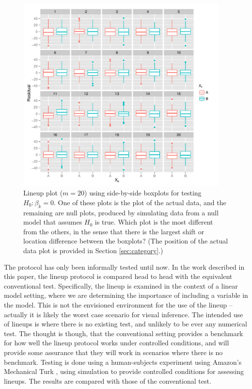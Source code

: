 \documentclass{article}
\begin{document}
\begin{figure}[htp]
   \centering
       \includegraphics[width=0.95\textwidth]{lineup_category.pdf}
       \caption{Lineup plot ($m=20$) using side-by-side boxplots for testing $H_0: \beta_k=0$. One of these plots is the plot of the actual data, and the remaining are null plots, produced by simulating data from a null model that assumes $H_0$ is true. Which plot is the most different from the others, in the sense that there is the largest shift or location difference between the boxplots? (The position of the actual data plot is provided in Section \ref{sec:category}.)}
       \label{fig:test_category}
\end{figure}

The protocol has only been informally tested until now. In the work described in this paper, the lineup protocol is compared head to head with the equivalent conventional test. Specifically, the lineup is examined in the context of a linear model setting, where we are determining the importance of including a variable in the model. This is not the envisioned environment for the use of the lineup -- actually it is likely the worst case scenario for visual inference. The intended use of lineups is where there is no existing test, and unlikely to be ever any numerical test. The thought is though, that the conventional setting provides a benchmark for how well the lineup protocol works under controlled conditions, and will provide some assurance that they will work in scenarios where there is no benchmark. Testing is done using a human-subjects experiment using Amazon's Mechanical Turk \citep{turk}, using simulation to provide controlled conditions for assessing lineups. The results are compared with those of the conventional test. 
\end{document}
